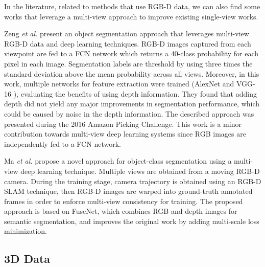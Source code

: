 In the literature, related to methods that use \acs{RGB-D} data, we can also find some works that leverage a multi-view approach to improve existing single-view works.

Zeng \emph{et al.}\cite{Zeng2016} present an object segmentation approach that leverages multi-view \acs{RGB-D} data and deep learning techniques. RGB-D images captured from each viewpoint are fed to a \acs{FCN} network which returns a 40-class probability for each pixel in each image. Segmentation labels are threshold by using three times the standard deviation above the mean probability across all views. Moreover, in this work, multiple networks for feature extraction were trained (AlexNet \cite{Krizhevsky2012} and \acs{VGG}-16 \cite{Simonyan2014}), evaluating the benefits of using depth information. They found that adding depth did not yield any major improvements in segmentation performance, which could be caused by noise in the depth information. The described approach was presented during the 2016 Amazon Picking Challenge. This work is a minor contribution towards multi-view deep learning systems since \acs{RGB} images are independently fed to a \acs{FCN} network.

Ma \emph{et al.}\cite{Ma2017} propose a novel approach for object-class segmentation using a multi-view deep learning technique. Multiple views are obtained from a moving RGB-D camera. During the training stage, camera trajectory is obtained using an RGB-D SLAM technique, then RGB-D images are warped into ground-truth annotated frames in order to enforce multi-view consistency for training. The proposed approach is based on FuseNet\cite{Hazirbas2016}, which combines \acs{RGB} and depth images for semantic segmentation, and improves the original work by adding multi-scale loss minimization.

\subsection{\acs{3D} Data}

